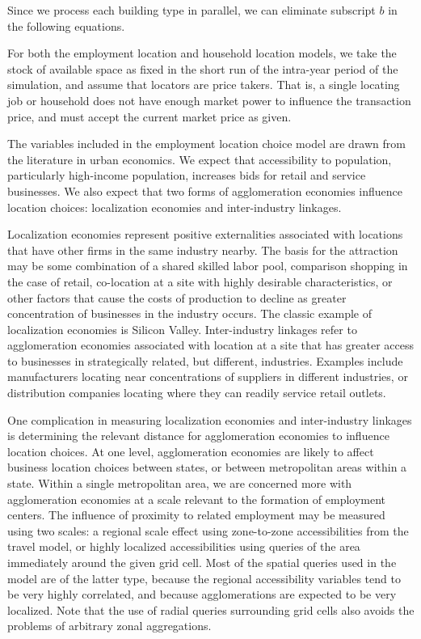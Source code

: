 Since we process each building type in parallel, we can eliminate
subscript $b$ in the following equations.

For both the employment location and household location
models, we take the stock of available space as fixed in the
short run of the intra-year period of the simulation, and
assume that locators are price takers.  That is, a single
locating job or household does not have enough market power
to influence the transaction price, and must accept the
current market price as given.

The variables included in the employment location choice model are
drawn from the literature in urban economics.  We expect that
accessibility to population, particularly high-income population,
increases bids for retail and service businesses.  We also expect
that two forms of agglomeration economies influence location
choices: localization economies and inter-industry linkages.

Localization economies represent positive externalities associated
with locations that have other firms in the same industry nearby.
The basis for the attraction may be some combination of a shared
skilled labor pool, comparison shopping in the case of retail,
co-location at a site with highly desirable characteristics, or
other factors that cause the costs of production to decline as
greater concentration of businesses in the industry occurs.  The
classic example of localization economies is Silicon Valley.
Inter-industry linkages refer to agglomeration economies
associated with location at a site that has greater access to
businesses in strategically related, but different, industries.
Examples include manufacturers locating near concentrations of
suppliers in different industries, or distribution companies
locating where they can readily service retail outlets.

One complication in measuring localization economies and
inter-industry linkages is determining the relevant distance for
agglomeration economies to influence location choices.  At one
level, agglomeration economies are likely to affect business
location choices between states, or between metropolitan areas
within a state.  Within a single metropolitan area, we are
concerned more with agglomeration economies at a scale relevant to
the formation of employment centers.  The influence of proximity
to related employment may be measured using two scales: a regional
scale effect using zone-to-zone accessibilities from the travel
model, or highly localized accessibilities using queries of the
area immediately around the given grid cell.  Most of the spatial
queries used in the model are of the latter type, because the
regional accessibility variables tend to be very highly
correlated, and because agglomerations are expected to be very
localized.  Note that the use of radial queries surrounding grid
cells also avoids the problems of arbitrary zonal aggregations.

